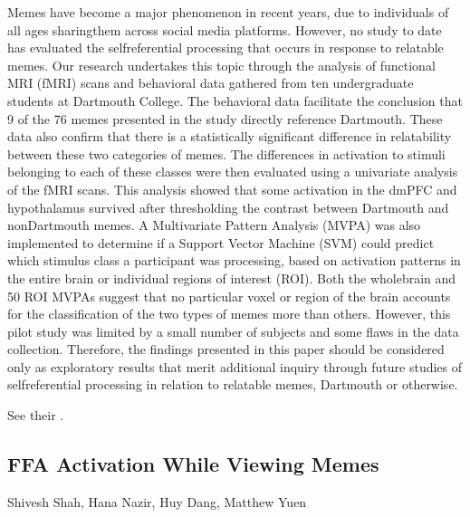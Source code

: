 \documentclass[letterpaper,10pt,english]{sphinxmanual}
\begin{document}
Memes have become a major phenomenon in recent years, due to individuals of all ages sharingthem across social media platforms. However, no study to date has evaluated the self\sphinxhyphen{}referential processing that occurs in response to relatable memes. Our research undertakes this topic through the analysis of functional MRI (fMRI) scans and behavioral data gathered from ten undergraduate students at Dartmouth College. The behavioral data facilitate the conclusion that 9 of the 76 memes presented in the study directly reference Dartmouth. These data also confirm that there is a statistically significant difference in relatability between these two categories of memes. The differences in activation to stimuli belonging to each of these classes were then evaluated using a univariate analysis of the fMRI scans. This analysis showed that some activation in the dmPFC and hypothalamus survived after thresholding the contrast between Dartmouth and non\sphinxhyphen{}Dartmouth memes. A Multivariate Pattern Analysis (MVPA) was also implemented to determine if a Support Vector Machine (SVM) could predict which stimulus class a participant was processing, based on activation patterns in the entire brain or individual regions of interest (ROI). Both the whole\sphinxhyphen{}brain and 50 ROI MVPAs suggest that no particular voxel or region of the brain accounts for the classification of the two types of memes more than others. However, this pilot study was limited by a small number of subjects and some flaws in the data collection. Therefore, the findings presented in this paper should be considered only as exploratory results that merit additional inquiry through future studies of self\sphinxhyphen{}referential processing in relation to relatable memes, Dartmouth or otherwise.

See their .


\subsection{FFA Activation While Viewing Memes}
\label{\detokenize{content/2019_Spring:ffa-activation-while-viewing-memes}}
Shivesh Shah, Hana Nazir, Huy Dang, Matthew Yuen
\end{document}
